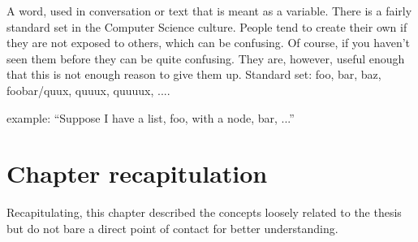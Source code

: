 \documentclass[proposal.tex]{subfiles}
\begin{document}
\cite{webste:metasyntacticvariablesc2wiki}

A word, used in conversation or text that is meant as a variable. There is a fairly standard set in the Computer Science
culture. People tend to create their own if they are not exposed to others, which can be confusing. Of course, if you haven't seen them before they can be quite confusing. They are, however, useful enough that this is not enough reason to give them up.
Standard set: foo, bar, baz, foobar/quux, quuux, quuuux, ....

example: ``Suppose I have a list, foo, with a node, bar, ...''


\section{Chapter recapitulation}
Recapitulating, this chapter described the concepts loosely related to the thesis but do not bare a direct point of contact for better 
understanding.
\end{document}

